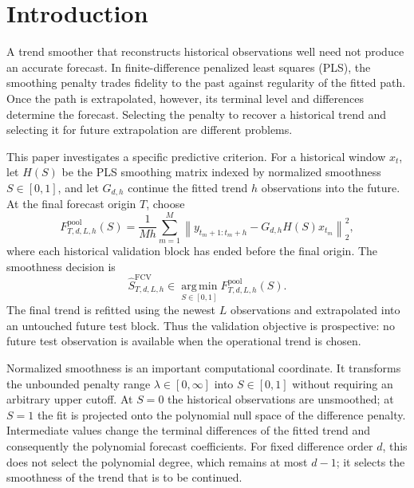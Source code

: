 \section{Introduction}
\label{sec:introduction}

A trend smoother that reconstructs historical observations well
need not produce an accurate forecast. In finite-difference
penalized least squares (PLS), the smoothing penalty trades
fidelity to the past against regularity of the fitted path.
Once the path is extrapolated, however, its terminal
level and differences determine the forecast. Selecting
the penalty to recover a historical trend and selecting
it for future extrapolation are different problems.

This paper investigates a specific predictive criterion.
For a historical window $x_t$, let $H(S)$ be the PLS
smoothing matrix indexed by normalized smoothness
$S\in[0,1]$, and let $G_{d,h}$ continue the fitted
trend $h$ observations into the future. At the final
forecast origin $T$, choose
\begin{equation}
\label{eq:intro_pooled_loss}
F^{\mathrm{pool}}_{T,d,L,h}(S)
=\frac{1}{Mh}\sum_{m=1}^M
\left\|y_{t_m+1:t_m+h}
-G_{d,h}H(S)x_{t_m}\right\|_2^2,
\end{equation}
where each historical validation block has ended
before the final origin. The smoothness decision is
\begin{equation}
\label{eq:intro_pooled_choice}
\widehat S^{\mathrm{FCV}}_{T,d,L,h}
\in\operatorname*{arg\,min}_{S\in[0,1]}
F^{\mathrm{pool}}_{T,d,L,h}(S).
\end{equation}
The final trend is refitted using the newest $L$
observations and extrapolated into an untouched
future test block. Thus the validation objective
is prospective: no future test observation is
available when the operational trend is chosen.

Normalized smoothness is an important computational
coordinate. It transforms the unbounded penalty
range $\lambda\in[0,\infty]$ into $S\in[0,1]$
without requiring an arbitrary upper cutoff.
At $S=0$ the historical observations are unsmoothed;
at $S=1$ the fit is projected onto the polynomial
null space of the difference penalty. Intermediate
values change the terminal differences of the fitted
trend and consequently the polynomial forecast
coefficients. For fixed difference order $d$, this
does not select the polynomial degree, which
remains at most $d-1$; it selects the smoothness
of the trend that is to be continued.

